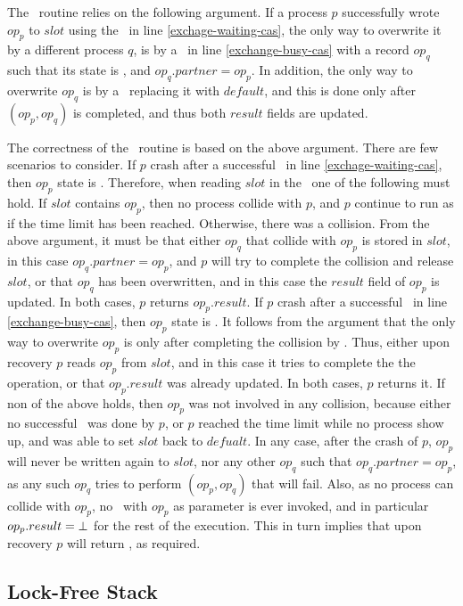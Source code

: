 The \recoverExchange\ routine relies on the following argument. If a process $p$ successfully wrote $op_p$ to $slot$ using the \CAS\ in line \ref{exchage-waiting-cas}, the only way to overwrite it by a different process $q$, is by a \CAS\ in line \ref{exchange-busy-cas} with a record $op_q$ such that its state is \busy, and $op_q.partner = op_p$. In addition, the only way to overwrite $op_q$ is by a \CAS\ replacing it with $default$, and this is done only after \switchPair$(op_p, op_q)$ is completed, and thus both $result$ fields are updated.

The correctness of the \recoverExchange\ routine is based on the above argument. There are few scenarios to consider.
If $p$ crash after a successful \CAS\ in line \ref{exchage-waiting-cas}, then $op_p$ state is \waiting. Therefore, when reading $slot$ in the \recoverExchange\ one of the following must hold. If $slot$ contains $op_p$, then no process collide with $p$, and $p$ continue to run as if the time limit has been reached. Otherwise, there was a collision. From the above argument, it must be that either $op_q$ that collide with $op_p$ is stored in $slot$, in this case $op_q.partner = op_p$, and $p$ will try to complete the collision and release $slot$, or that $op_q$ has been overwritten, and in this case the $result$ field of $op_p$ is updated. In both cases, $p$ returns $op_p.result$.
If $p$ crash after a successful \CAS\ in line \ref{exchange-busy-cas}, then $op_p$ state is \busy. It follows from the argument that the only way to overwrite $op_p$ is only after completing the collision by \switchPair. Thus, either upon recovery $p$ reads $op_p$ from $slot$, and in this case it tries to complete the the operation, or that $op_p.result$ was already updated. In both cases, $p$ returns it.
If non of the above holds, then $op_p$ was not involved in any collision, because either no successful \CAS\ was done by $p$, or $p$ reached the time limit while no process show up, and was able to set $slot$ back to $defualt$. In any case, after the crash of $p$, $op_p$ will never be written again to $slot$, nor any other $op_q$ such that $op_q.partner = op_p$, as any such $op_q$ tries to perform \CAS$(op_p,op_q)$ that will fail. Also, as no process can collide with $op_p$, no \switchPair\ with $op_p$ as parameter is ever invoked, and in particular $op_p.result = \mbox{$\bot$}$ for the rest of the execution. This in turn implies that upon recovery $p$ will return \fail, as required.


\subsection{Lock-Free Stack}

